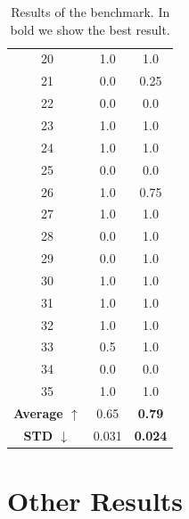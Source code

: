\documentclass[a4paper,12pt,twoside]{ThesisStyle}
\begin{document}
\begin{table}[H]
\begin{tabular}{|c|c|c|}
    20                & 1.0                          & 1.0                        \\
    21                & 0.0                          & 0.25                        \\
    22                & 0.0                          & 0.0                        \\
    23                & 1.0                          & 1.0                        \\
    24                & 1.0                          & 1.0                        \\
    25                & 0.0                          & 0.0                        \\
    26                & 1.0                          & 0.75                        \\
    27                & 1.0                          & 1.0                        \\
    28                & 0.0                          & 1.0                        \\
    29                & 0.0                          & 1.0                        \\
    30                & 1.0                          & 1.0                        \\
    31                & 1.0                          & 1.0                        \\
    32                & 1.0                          & 1.0                        \\
    33                & 0.5                          & 1.0                        \\
    34                & 0.0                          & 0.0                        \\
    35                & 1.0                          & 1.0                        \\
    \hline
    \textbf{Average \(\uparrow\)}  & 0.65                         & \textbf{0.79}                        \\
    \hline
    \textbf{STD \(\downarrow\)}      & 0.031                         & \textbf{0.024}                        \\
    \hline
  \end{tabular}
  \caption{Results of the benchmark. In bold we show the best result.}
  \label{tab:benchmark_results}
\end{table}

\section{Other Results}
\label{sec:other_results}
\end{document}
